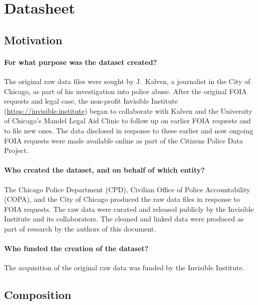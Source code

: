 \section{Datasheet}

\subsection{Motivation}

\paragraph{For what purpose was the dataset created?}
The original raw data files were sought by J.~Kalven, a journalist in the City
of Chicago, as part of his investigation into police abuse. After the original
FOIA requests and legal case, the non-profit Invisible Institute (\url{https://invisible.institute}) 
began to collaborate with Kalven and the University of Chicago's Mandel Legal Aid Clinic
to follow up on earlier FOIA requests and to file new ones. The data disclosed
in response to these earlier and now ongoing FOIA requests were made available
online as part of the Citizens Police Data Project.

\paragraph{Who created the dataset, and on behalf of which entity?}
The Chicago Police Department (CPD), Civilian Office of Police Accountability
(COPA), and the City of Chicago produced the raw data files in response to FOIA
requests. The raw data were curated and released publicly by the Invisible
Institute and its collaborators. The cleaned and linked data were produced
as part of research by the authors of this document.

\paragraph{Who funded the creation of the dataset?}
The acquisition of the original raw data was funded by the Invisible Institute.

\subsection{Composition}

